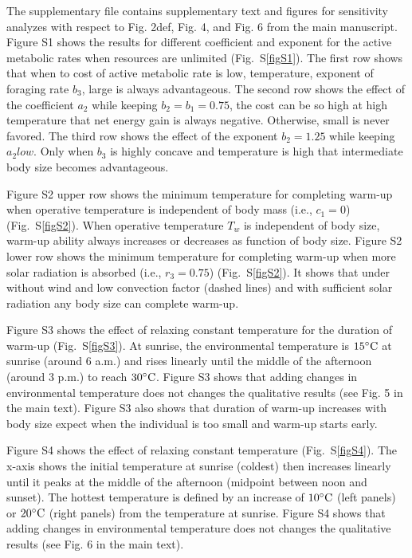 \documentclass[12pt]{article}
\date{\vspace{-5ex}}
\begin{document}
\maketitle 

The supplementary file contains supplementary text and figures for sensitivity analyzes with respect to Fig. 2def, Fig. 4, and Fig. 6 from the main manuscript.
Figure S1  shows the results for different coefficient and exponent for the active metabolic  rates  when resources are unlimited (Fig.~S\ref{figS1}). 
The first row shows that when to cost of active metabolic rate is low, temperature, exponent of foraging rate $b_3$, large is always advantageous.
The second row shows the effect of the coefficient $a_2$ while keeping $b_2 = b_1 = 0.75$, the cost can be so high at high temperature that net energy gain is always negative.
Otherwise, small is never favored.
The third row shows the effect of the exponent $b_2 = 1.25$ while keeping $a_2 low$.
Only when $b_3$ is highly concave and temperature is high that intermediate body size becomes advantageous.

Figure S2  upper row shows the minimum temperature for completing warm-up when operative temperature is independent of body mass  (i.e., $c_1 = 0$) (Fig.~S\ref{figS2}).
When operative temperature $T_w$ is independent of body size, warm-up ability always increases or decreases as function of body size.
Figure S2 lower row shows the minimum temperature for completing warm-up when more solar radiation is absorbed (i.e., $r_3 = 0.75$) (Fig.~S\ref{figS2}).
It shows that under without wind and low convection factor (dashed lines) and with sufficient solar radiation any body size can complete warm-up.

Figure S3 shows the effect of relaxing constant temperature for the duration of warm-up (Fig.~S\ref{figS3}).
At sunrise, the environmental temperature is  $15 ^{\circ}\rm{C}$ at sunrise (around 6 a.m.) and rises linearly until the middle of the afternoon (around 3 p.m.) to reach $30 ^{\circ}\rm{C}$.
Figure S3 shows that adding changes in environmental temperature does not changes the qualitative results (see Fig. 5 in the main text).
Figure S3 also shows that duration of warm-up increases with body size expect when the individual is too small and warm-up starts early.

Figure S4 shows the effect of relaxing constant temperature (Fig.~S\ref{figS4}).
The x-axis shows the initial temperature at sunrise (coldest) then increases linearly until it peaks at the middle of the afternoon (midpoint between noon and sunset). The hottest temperature is defined by an increase of $10 ^{\circ}\rm{C}$ (left panels) or $20 ^{\circ}\rm{C}$ (right panels) from the temperature at sunrise.
Figure S4 shows that adding changes in environmental temperature does not changes the qualitative results (see Fig. 6 in the main text).
\end{document}
